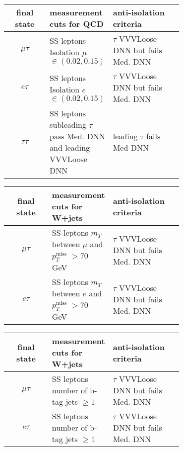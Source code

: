 \begin{table}[h!tbp]
\centering
{}
\begin{tabular*}{0.8\textwidth}{c|p{0.3\linewidth}|p{0.4\linewidth}}
\hline
final state      & measurement cuts for QCD & anti-isolation criteria\\\hline 
$\mu\tau$  & SS leptons Isolation $\mu$ $\in(0.02,0.15)$ & $\tau$ VVVLoose DNN but fails Med. DNN  \\\hline
$ e \tau$  & SS leptons Isolation $e$ $\in(0.02,0.15)$ & $\tau$ VVVLoose DNN but fails Med. DNN \\\hline
$\tau\tau$ & SS leptons subleading $\tau$ pass Med. DNN and leading VVVLoose DNN & leading $\tau$ fails Med DNN \\\hline
\end{tabular*}
\end{table}

\begin{table}[h!tbp]
\centering
{}
\begin{tabular*}{0.8\textwidth}{c|p{0.3\linewidth}|p{0.4\linewidth}}
\hline
final state      & measurement cuts for W+jets & anti-isolation criteria\\\hline 
$\mu\tau$  & SS leptons $m_T$ between $\mu$ and $p_T^{\text{miss}}$ $> 70 $ GeV  & $\tau$ VVVLoose DNN but fails Med. DNN  \\\hline
$ e \tau$  & SS leptons $m_T$ between $e$ and $p_T^{\text{miss}}$ $> 70 $ GeV  & $\tau$ VVVLoose DNN but fails Med. DNN \\\hline
\end{tabular*}
\end{table}

\begin{table}[h!tbp]
\centering
{}
\begin{tabular*}{0.8\textwidth}{c|p{0.3\linewidth}|p{0.4\linewidth}}
\hline
final state      & measurement cuts for W+jets & anti-isolation criteria \\\hline 
$\mu\tau$  & SS leptons number of b-tag jets $\geq 1 $ & $\tau$ VVVLoose DNN but fails Med. DNN \\\hline
$ e \tau$  & SS leptons number of b-tag jets $\geq 1 $ & $\tau$ VVVLoose DNN but fails Med. DNN \\\hline
\end{tabular*}
\end{table}

